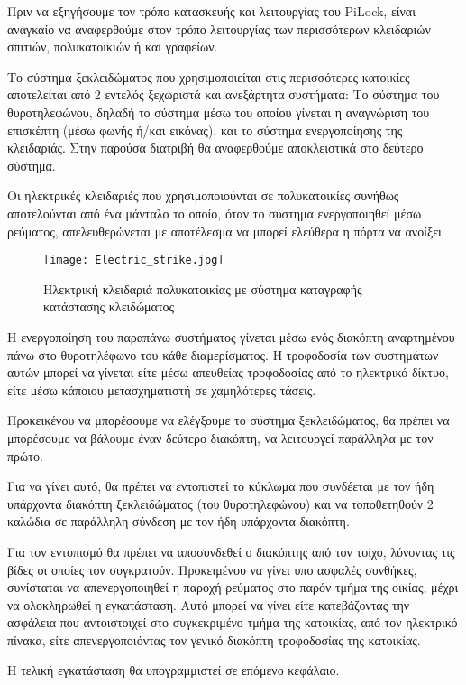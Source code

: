 Πριν να εξηγήσουμε τον τρόπο κατασκευής και λειτουργίας του PiLock, είναι αναγκαίο να αναφερθούμε στον τρόπο λειτουργίας των περισσότερων κλειδαριών σπιτιών, πολυκατοικιών ή και γραφείων.

Το σύστημα ξεκλειδώματος που χρησιμοποιείται στις περισσότερες κατοικίες αποτελείται από 2 εντελός ξεχωριστά και ανεξάρτητα συστήματα: Το σύστημα του θυροτηλεφώνου, δηλαδή το σύστημα μέσω του οποίου γίνεται η αναγνώριση του επισκέπτη (μέσω φωνής ή/και εικόνας), και το σύστημα ενεργοποίησης της κλειδαριάς. Στην παρούσα διατριβή θα αναφερθούμε αποκλειστικά στο δεύτερο σύστημα.

Οι ηλεκτρικές κλειδαριές που χρησιμοποιούνται σε πολυκατοικίες συνήθως αποτελούνται από ένα μάνταλο το οποίο, όταν το σύστημα ενεργοποιηθεί μέσω ρεύματος, απελευθερώνεται με αποτέλεσμα να μπορεί ελεύθερα η πόρτα να ανοίξει.

\begin{figure}[h]
	\centering
		\texttt{[image: Electric\_strike.jpg]}
	\caption{Ηλεκτρική κλειδαριά πολυκατοικίας με σύστημα καταγραφής κατάστασης κλειδώματος}
\end{figure}

Η ενεργοποίηση του παραπάνω συστήματος γίνεται μέσω ενός διακόπτη αναρτημένου πάνω στο θυροτηλέφωνο του κάθε διαμερίσματος. Η τροφοδοσία των συστημάτων αυτών μπορεί να γίνεται είτε μέσω απευθείας τροφοδοσίας από το ηλεκτρικό δίκτυο, είτε μέσω κάποιου μετασχηματιστή σε χαμηλότερες τάσεις.

Προκεικένου να μπορέσουμε να ελέγξουμε το σύστημα ξεκλειδώματος, θα πρέπει να μπορέσουμε να βάλουμε έναν δεύτερο διακόπτη, να λειτουργεί παράλληλα με τον πρώτο.  %

Για να γίνει αυτό, θα πρέπει να εντοπιστεί το κύκλωμα που συνδέεται με τον ήδη υπάρχοντα διακόπτη ξεκλειδώματος (του θυροτηλεφώνου) και να τοποθετηθούν 2 καλώδια σε παράλληλη σύνδεση με τον ήδη υπάρχοντα διακόπτη.

Για τον εντοπισμό θα πρέπει να αποσυνδεθεί ο διακόπτης από τον τοίχο, λύνοντας τις βίδες οι οποίες τον συγκρατούν. Προκειμένου να γίνει υπο ασφαλές συνθήκες, συνίσταται να απενεργοποιηθεί η παροχή ρεύματος στο παρόν τμήμα της οικίας, μέχρι να ολοκληρωθεί η εγκατάσταση. Αυτό μπορεί να γίνει είτε κατεβάζοντας την ασφάλεια που αντοιστοιχεί στο συγκεκριμένο τμήμα της κατοικίας, από τον ηλεκτρικό πίνακα, είτε απενεργοποιόντας τον γενικό διακόπτη τροφοδοσίας της κατοικίας.

Η τελική εγκατάσταση θα υπογραμμιστεί σε επόμενο κεφάλαιο.